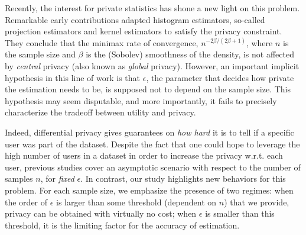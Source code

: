 \documentclass[10pt]{article} %
\newcommand\RG[1]{\textcolor{red}{#1}}
\newcommand\AG[1]{\textcolor{magenta}{#1}}
\newcommand\B[1]{{#1}}
\begin{document}
Recently, the interest for private statistics has shone a new light on this problem. Remarkable early contributions \citep{wasserman2010statistical,hall2013differential} adapted histogram estimators, so-called projection estimators and kernel estimators to satisfy the privacy constraint. They conclude that the minimax rate of convergence, $n^{- 2 \beta/(2 \beta + 1)}$, where $n$ is the sample size and $\beta$ is the (Sobolev) smoothness of the density, is not affected by \emph{\B{central}} privacy (also known as {\em global} privacy).
However, an important implicit hypothesis in this line of work is that $\epsilon$, the parameter that decides how private the estimation needs to be, is supposed not to depend on the sample size. This hypothesis may seem disputable, and more importantly, it fails to precisely characterize the tradeoff between utility and privacy. 

\B{Indeed, differential privacy gives guarantees on \emph{how hard} it is to tell if a specific user was part of the dataset. Despite the fact that one could hope to leverage the high number of users in a dataset in order to increase the privacy w.r.t. each user,
previous studies \citep{wasserman2010statistical,hall2013differential} cover an asymptotic scenario with respect to the number of samples $n$, for {\em fixed} $\epsilon$. 
In contrast, our study highlights new behaviors for this problem.
For each sample size, we emphasize the presence of two regimes: when the order of $\epsilon$ is larger than some threshold (dependent on $n$) that we provide, privacy can be obtained with virtually no cost; when $\epsilon$ is smaller than this threshold, it is the limiting factor for the accuracy of estimation.}
\end{document}
